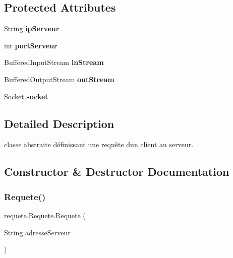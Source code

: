 \subsection*{Protected Attributes}
\begin{DoxyCompactItemize}
\item 
\mbox{\label{classrequete_1_1Requete_ac459a04e0e05713cf40d2810141730f1}} 
String {\bfseries ip\+Serveur}
\item 
\mbox{\label{classrequete_1_1Requete_a09be09377c9ce1174e027c9bc852c0ab}} 
int {\bfseries port\+Serveur}
\item 
\mbox{\label{classrequete_1_1Requete_a487b0b95bcb22cd79e17b8ba2756daa6}} 
Buffered\+Input\+Stream {\bfseries in\+Stream}
\item 
\mbox{\label{classrequete_1_1Requete_aec10f73f1c9edcba8a6aeffbd9dc932b}} 
Buffered\+Output\+Stream {\bfseries out\+Stream}
\item 
\mbox{\label{classrequete_1_1Requete_a8bbfc163d41bdf7d3ed614e0341a1bc8}} 
Socket {\bfseries socket}
\end{DoxyCompactItemize}


\subsection{Detailed Description}
classe abstraite définissant une requête d\textquotesingle{}un client au serveur. 

\subsection{Constructor \& Destructor Documentation}
\mbox{\label{classrequete_1_1Requete_a6ed8eefb9335b37f2348f5c323a46b53}} 
\subsubsection{\texorpdfstring{Requete()}{Requete()}}
{\footnotesize\ttfamily requete.\+Requete.\+Requete (\begin{DoxyParamCaption}\item[{String}]{adresse\+Serveur }\end{DoxyParamCaption})\hspace{0.3cm}{\ttfamily [inline]}}



